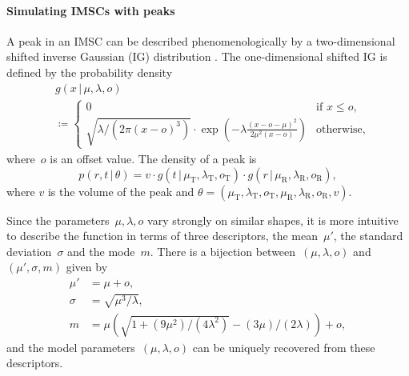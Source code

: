 \documentclass{article}
\newcommand{\given}{\,|\,}
\begin{document}
\paragraph{Simulating IMSCs with peaks}
A peak in an IMSC can be described phenomenologically by a two-dimensional shifted inverse Gaussian (IG) distribution \citep{Kopczynski/etal/2012a}.
The one-dimensional shifted IG is defined by the probability density
\begin{align}
   & g(x \given \mu, \lambda, o)\nonumber \\
   & \coloneq \begin{cases}
     0 & \text{if } x \leq o, \\
     \sqrt{\lambda / (2 \pi (x - o)^3)} \cdot
     \exp \left(-\lambda \frac{(x - o - \mu)^2}{2 \mu^2 (x - o)}
     \right)  & \text{otherwise,}\label{eq:inversegauss}
     \end{cases}
\end{align}
where~$o$ is an offset value.
The density of a peak is
\begin{equation}
p(r, t \given \theta) 
= v \cdot g(t \given \mu_{\text{T}}, \lambda_{\text{T}}, o_{\text{T}}) \cdot g(r \given \mu_{\text{R}}, \lambda_{\text{R}}, o_{\text{R}}),
\end{equation}
where $v$ is the volume of the peak and $\theta = (\mu_{\text{T}}, \lambda_{\text{T}}, o_{\text{T}}, \mu_{\text{R}}, \lambda_{\text{R}}, o_{\text{R}}, v)$.

Since the parameters~$\mu,\lambda, o$ vary strongly on similar shapes, it is more intuitive to describe the function in terms of three descriptors, the mean~$\mu'$, the standard deviation~$\sigma$ and the mode~$m$.
There is a bijection between~$(\mu,\lambda, o)$ and~$(\mu', \sigma, m)$ given by
\begin{align*}
  \mu'   &= \mu + o, \\
  \sigma &= \sqrt{\mu^3 / \lambda},\\
  m      &= \mu \left(\sqrt{ 1 + (9\mu^2)/(4\lambda^2)} - (3\mu)/(2\lambda) \right) + o,
\end{align*}
and the model parameters~$(\mu,\lambda, o)$ can be uniquely recovered from these descriptors.
\end{document}
